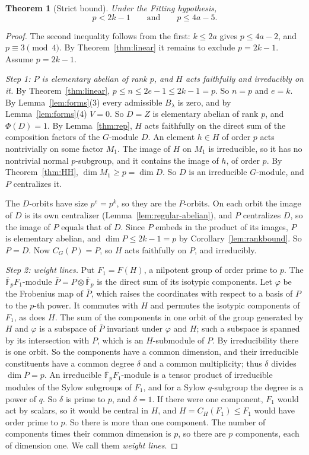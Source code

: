\documentclass[11pt]{amsart}
\newtheorem{theorem}{Theorem}
\theoremstyle{definition}
\theoremstyle{remark}
\newcommand{\F}{\mathbb{F}}
\newcommand{\Kb}{\overline{\F}_p}
\begin{document}
\begin{theorem}[Strict bound]\label{thm:endpoint}
Under the Fitting hypothesis,
\[
p<2k-1\qquad\text{and}\qquad p\le4a-5 .
\]
\end{theorem}
\begin{proof}
The second inequality follows from the first: $k\le2a$ gives $p\le4a-2$, and $p\equiv3\pmod4$. By Theorem~\ref{thm:linear} it remains to exclude $p=2k-1$. Assume $p=2k-1$.

\emph{Step 1: $P$ is elementary abelian of rank $p$, and $H$ acts faithfully and irreducibly on it.} By Theorem~\ref{thm:linear}, $p\le n\le2e-1\le2k-1=p$. So $n=p$ and $e=k$. By Lemma~\ref{lem:forms}(3) every admissible $B_\lambda$ is zero, and by Lemma~\ref{lem:forms}(4) $V=0$. So $D=Z$ is elementary abelian of rank $p$, and $\Phi(D)=1$. By Lemma~\ref{thm:rep}, $H$ acts faithfully on the direct sum of the composition factors of the $G$-module $D$. An element $h\in H$ of order $p$ acts nontrivially on some factor $M_1$. The image of $H$ on $M_1$ is irreducible, so it has no nontrivial normal $p$-subgroup, and it contains the image of $h$, of order $p$. By Theorem~\ref{thm:HH}, $\dim M_1\ge p=\dim D$. So $D$ is an irreducible $G$-module, and $P$ centralizes it.

The $D$-orbits have size $p^e=p^k$, so they are the $P$-orbits. On each orbit the image of $D$ is its own centralizer (Lemma~\ref{lem:regular-abelian}), and $P$ centralizes $D$, so the image of $P$ equals that of $D$. Since $P$ embeds in the product of its images, $P$ is elementary abelian, and $\dim P\le2k-1=p$ by Corollary~\ref{lem:rankbound}. So $P=D$. Now $C_G(P)=P$, so $H$ acts faithfully on $P$, and irreducibly.

\emph{Step 2: weight lines.} Put $F_1=F(H)$, a nilpotent group of order prime to $p$. The $\Kb F_1$-module $\bar P=P\otimes\Kb$ is the direct sum of its isotypic components. Let $\varphi$ be the Frobenius map of $\bar P$, which raises the coordinates with respect to a basis of $P$ to the $p$-th power. It commutes with $H$ and permutes the isotypic components of $F_1$, as does $H$. The sum of the components in one orbit of the group generated by $H$ and $\varphi$ is a subspace of $\bar P$ invariant under $\varphi$ and $H$; such a subspace is spanned by its intersection with $P$, which is an $H$-submodule of $P$. By irreducibility there is one orbit. So the components have a common dimension, and their irreducible constituents have a common degree $\delta$ and a common multiplicity; thus $\delta$ divides $\dim\bar P=p$. An irreducible $\Kb F_1$-module is a tensor product of irreducible modules of the Sylow subgroups of $F_1$, and for a Sylow $q$-subgroup the degree is a power of $q$. So $\delta$ is prime to $p$, and $\delta=1$. If there were one component, $F_1$ would act by scalars, so it would be central in $H$, and $H=C_H(F_1)\le F_1$ would have order prime to $p$. So there is more than one component. The number of components times their common dimension is $p$, so there are $p$ components, each of dimension one. We call them \emph{weight lines}.


\end{proof}
\end{document}
